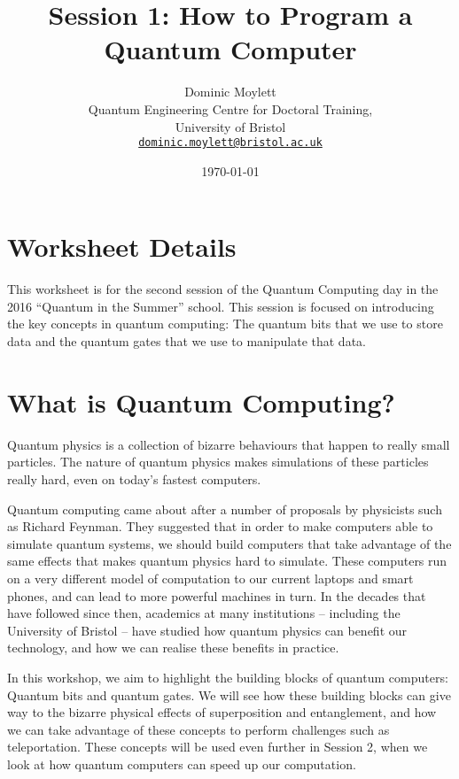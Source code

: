 \documentclass[twocolumn]{article}
\begin{document}
\lstset{style=Style1}

\title{Session 1: How to Program a Quantum Computer}
\author{Dominic Moylett\\
        	Quantum Engineering Centre for Doctoral Training,\\
		University of Bristol\\
		\texttt{\href{mailto:dominic.moylett@bristol.ac.uk}{dominic.moylett@bristol.ac.uk}}
		}
\date{\today}
\maketitle

\section*{Worksheet Details}

This worksheet is for the second session of the Quantum Computing day in the 2016 ``Quantum in the Summer'' school. This session is focused on introducing the key concepts in quantum computing: The quantum bits that we use to store data and the quantum gates that we use to manipulate that data.

\section{What is Quantum Computing?}

Quantum physics is a collection of bizarre behaviours that happen to really small particles. The nature of quantum physics makes simulations of these particles really hard, even on today's fastest computers.

Quantum computing came about after a number of proposals by physicists such as Richard Feynman. They suggested that in order to make computers able to simulate quantum systems, we should build computers that take advantage of the same effects that makes quantum physics hard to simulate. These computers run on a very different model of computation to our current laptops and smart phones, and can lead to more powerful machines in turn. In the decades that have followed since then, academics at many institutions -- including the University of Bristol -- have studied how quantum physics can benefit our technology, and how we can realise these benefits in practice.

In this workshop, we aim to highlight the building blocks of quantum computers: Quantum bits and quantum gates. We will see how these building blocks can give way to the bizarre physical effects of superposition and entanglement, and how we can take advantage of these concepts to perform challenges such as teleportation. These concepts will be used even further in Session 2, when we look at how quantum computers can speed up our computation.
\end{document}
